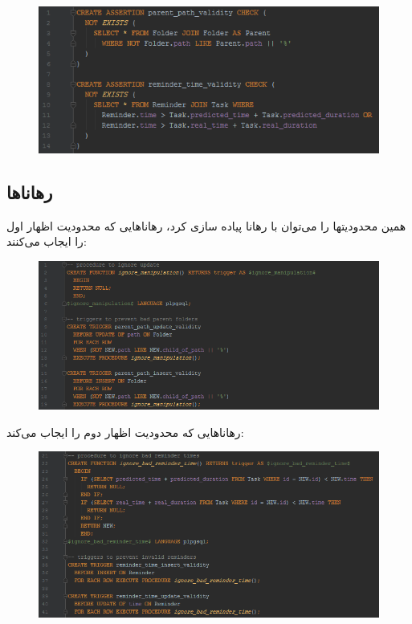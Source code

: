 \documentclass{article}
\begin{document}
\begin{figure}[hbt!]
  \includegraphics[width =\textwidth]{assertions}
\end{figure}
\subsection*{رهاناها}
 همین محدودیتها را می‌توان با رهانا پیاده سازی کرد، رهاناهایی که محدودیت اظهار اول را ایجاب می‌کنند:
 \begin{figure}[hbt!]
  \includegraphics[width =\textwidth]{triggers_1}
\end{figure}
\newpage

رهاناهایی که محدودیت اظهار دوم را ایجاب می‌کند:
\begin{figure}[htb]
  \includegraphics[width =\textwidth]{triggers_2}
\end{figure}
\end{document}
